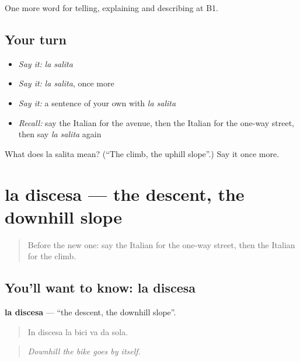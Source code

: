 \begin{grammarlens}[title={What you've built}]
One more word for telling, explaining and describing at B1.
\end{grammarlens}

\subsection*{Your turn}
\begin{itemize}
\raggedright
  \item \emph{Say it:} \emph{la salita}
  \item \emph{Say it:} \emph{la salita}, once more
  \item \emph{Say it:} a sentence of your own with \emph{la salita}
  \item \emph{Recall:} say the Italian for the avenue, then the Italian for the one-way street, then say \emph{la salita} again
\end{itemize}

\begin{tcolorbox}[breakable,colback=teal!4,colframe=teal!35!black,title={Before you move on}]
What does la salita mean? (\textquotedblleft{}The climb, the uphill slope\textquotedblright{}.) Say it once more.
\end{tcolorbox}
\section[la discesa]{la discesa — the descent, the downhill slope}

\label{lesson:IT-C442-discesa}



\begin{quote}
Before the new one: say the Italian for the one-way street, then the Italian for the climb.
\end{quote}

\subsection*{You'll want to know: la discesa}
\textbf{la discesa} — \textquotedblleft{}the descent, the downhill slope\textquotedblright{}.

\begin{quote}
In discesa la bici va da sola.
\end{quote}

\begin{quote}
\emph{Downhill the bike goes by itself.}
\end{quote}

